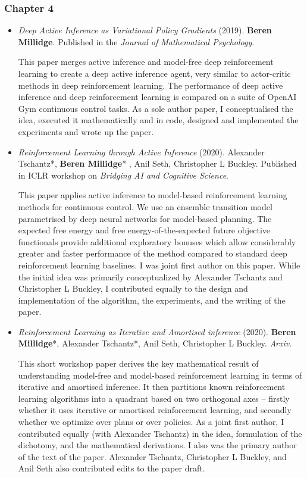 \subsubsection{Chapter 4}
\begin{itemize}
\item \emph{Deep Active Inference as Variational Policy Gradients} (2019). \textbf{Beren Millidge}. Published in the \emph{Journal of Mathematical Psychology}. 
\newline

This paper merges active inference and model-free deep reinforcement learning to create a deep active inference agent, very similar to actor-critic methods in deep reinforcement learning. The performance of deep active inference and deep reinforcement learning is compared on a suite of OpenAI Gym continuous control tasks. As a sole author paper, I conceptualised the idea, executed it mathematically and in code, designed and implemented the experiments and wrote up the paper. 

\item \emph{Reinforcement Learning through Active Inference} (2020). Alexander Tschantz*, \textbf{Beren Millidge}* , Anil Seth, Christopher L Buckley. Published in ICLR workshop on \emph{Bridging AI and Cognitive Science}. \newline

This paper applies active inference to model-based reinforcement learning methods for continuous control. We use an ensemble transition model parametrised by deep neural networks for model-based planning. The expected free energy and  free energy-of-the-expected future objective functionals provide additional exploratory bonuses which allow considerably greater and faster performance of the method compared to standard deep reinforcement learning baselines. I was joint first author on this paper. While the initial idea was primarily conceptualized by Alexander Tschantz and Christopher L Buckley, I contributed equally to the design and implementation of the algorithm, the experiments, and the writing of the paper.

\item \emph{Reinforcement Learning as Iterative and Amortised inference} (2020). \textbf{Beren Millidge}*, Alexander Tschantz*, Anil Seth, Christopher L Buckley. \emph{Arxiv}. \newline

This short workshop paper derives the key mathematical result of understanding model-free and model-based reinforcement learning in terms of iterative and amortised inference. It then partitions known reinforcement learning algorithms into a quadrant based on two orthogonal axes -- firstly whether it uses iterative or amortised reinforcement learning, and secondly whether we optimize over plans or over policies. As a joint first author, I contributed equally (with Alexander Tschantz) in the idea, formulation of the dichotomy, and the mathematical derivations. I also was the primary author of the text of the paper. Alexander Tschantz, Christopher L Buckley, and Anil Seth also contributed edits to the paper draft.


\end{itemize}
